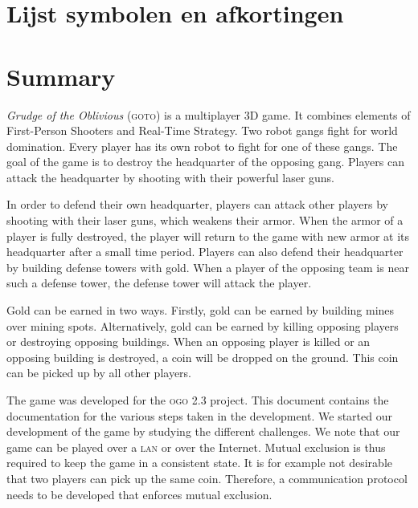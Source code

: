\documentclass[a4paper,11pt, twoside]{article}
\begin{document}
	

	\tableofcontents
	\newpage

	\section{Lijst symbolen en afkortingen}
    	
    \newpage

    \section{Summary}
    \emph{Grudge of the Oblivious} (\textsc{goto}) is a multiplayer 3D game. It combines elements of First-Person Shooters and Real-Time Strategy. Two robot gangs fight for world domination. Every player has its own robot to fight for one of these gangs. The goal of the game is to destroy the headquarter of the opposing gang. Players can attack the headquarter by shooting with their powerful laser guns.

    In order to defend their own headquarter, players can attack other players by shooting with their laser guns, which weakens their armor. When the armor of a player is fully destroyed, the player will return to the game with new armor at its headquarter after a small time period. Players can also defend their headquarter by building defense towers with gold. When a player of the opposing team is near such a defense tower, the defense tower will attack the player.

    Gold can be earned in two ways. Firstly, gold can be earned by building mines over mining spots. Alternatively, gold can be earned by killing opposing players or destroying opposing buildings. When an opposing player is killed or an opposing building is destroyed, a coin will be dropped on the ground. This coin can be picked up by all other players.

    The game was developed for the \textsc{ogo} 2.3 project. This document contains the documentation for the various steps taken in the development. We started our development of the game by studying the different challenges. We note that our game can be played over a \textsc{lan} or over the Internet. Mutual exclusion is thus required to keep the game in a consistent state. It is for example not desirable that two players can pick up the same coin. Therefore, a communication protocol needs to be developed that enforces mutual exclusion.
\end{document}
